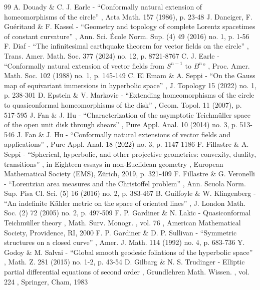 \documentclass[10pt]{amsart}
\theoremstyle{plain}
\theoremstyle{definition}
\begin{document}
\begin{thebibliography}{99}
 A. Douady \& C. J. Earle - “Conformally natural extension of homeomorphisms of the circle” , Acta Math. 157 (1986), p. 23-48
 J. Danciger, F. Guéritaud \& F. Kassel - “Geometry and topology of complete Lorentz spacetimes of constant curvature” , Ann. Sci. École Norm. Sup. (4) 49 (2016) no. 1, p. 1-56
 F. Diaf - “The infinitesimal earthquake theorem for vector fields on the circle” , Trans. Amer. Math. Soc. 377 (2024) no. 12, p. 8721-8767
 C. J. Earle - “Conformally natural extension of vector fields from $S^{n-1}$ to $B^{n}$” , Proc. Amer. Math. Soc. 102 (1988) no. 1, p. 145-149
 C. El Emam \& A. Seppi - “On the Gauss map of equivariant immersions in hyperbolic space” , J. Topology 15 (2022) no. 1, p. 238-301
 D. Epstein \& V. Markovic - “Extending homeomorphisms of the circle to quasiconformal homeomorphisms of the disk” , Geom. Topol. 11 (2007), p. 517-595
 J. Fan \& J. Hu - “Characterization of the asymptotic Teichmüller space of the open unit disk through shears” , Pure Appl. Anal. 10 (2014) no. 3, p. 513-546
 J. Fan \& J. Hu - “Conformally natural extensions of vector fields and applications” , Pure Appl. Anal. 18 (2022) no. 3, p. 1147-1186
 F. Fillastre \& A. Seppi - “Spherical, hyperbolic, and other projective geometries: convexity, duality, transitions” , in Eighteen essays in non-Euclidean geometry , European Mathematical Society (EMS), Zürich, 2019, p. 321-409
 F. Fillastre \& G. Veronelli - “Lorentzian area measures and the Christoffel problem” , Ann. Scuola Norm. Sup. Pisa Cl. Sci. (5) 16 (2016) no. 2, p. 383-467
 B. Guilfoyle \& W. Klingenberg - “An indefinite Kähler metric on the space of oriented lines” , J. London Math. Soc. (2) 72 (2005) no. 2, p. 497-509
 F. P. Gardiner \& N. Lakic - Quasiconformal Teichmüller theory , Math. Surv. Monogr. , vol. 76 , American Mathematical Society, Providence, RI, 2000
 F. P. Gardiner \& D. P. Sullivan - “Symmetric structures on a closed curve” , Amer. J. Math. 114 (1992) no. 4, p. 683-736
 Y. Godoy \& M. Salvai - “Global smooth geodesic foliations of the hyperbolic space” , Math. Z. 281 (2015) no. 1-2, p. 43-54
 D. Gilbarg \& N. S. Trudinger - Elliptic partial differential equations of second order , Grundlehren Math. Wissen. , vol. 224 , Springer, Cham, 1983

\end{thebibliography}
\end{document}
